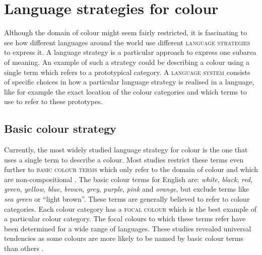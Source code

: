 \section{Language strategies for colour}
\label{s:strats-for-colour}

Although the domain of colour might seem fairly restricted, it is
fascinating to see how different languages around the world use
different \textsc{language strategies} to
express it. A language strategy is a particular approach to express
one subarea of meaning. An example of such a strategy could be
describing a colour using a single term which refers to a prototypical
category. A \textsc{language system} consists of
specific choices in how a particular language strategy is realised in
a language, like for example the exact location of the colour
categories and which terms to use to refer to these prototypes.

\subsection{Basic colour strategy}
\label{s:intro-basic-colour-strategy}

Currently, the most widely studied language strategy for colour is the
one that uses a single term to describe a colour. Most studies
restrict these terms even further to \textsc{basic colour
  terms} which only refer to the domain of
colour and which are non-compositional \citep{berlin69basic}. The
basic colour terms for English are: \textit{white}, \textit{black}, \textit{red},
\textit{green}, \textit{yellow}, \textit{blue}, \textit{brown}, \textit{grey}, \textit{purple},
\textit{pink} and \textit{orange}, but exclude terms like \textit{sea green} or
``light brown''. These terms are generally believed to refer to colour
categories. Each colour category has a \textsc{focal colour} which is the best example of a particular colour
category. The focal colours to which these terms refer have been
determined for a wide range of languages. These studies revealed
universal tendencies as some colours are more likely to be named by
basic colour terms than others \citep{regier05focal}.

